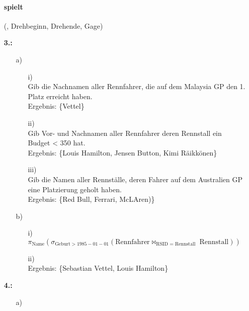 \documentclass[a4paper,11pt,fleqn]{scrartcl}
\begin{document}
\begin{enumerate}
		    \paragraph{spielt}(, Drehbeginn, 
		    Drehende, Gage)\\
		\item[\textbf{3.:}]
		\begin{enumerate}
			\item[a)]\quad \\
			\begin{enumerate}
				\item[i)]\quad \\
					Gib die Nachnamen aller Rennfahrer, die auf dem Malaysia GP den 1. Platz erreicht haben.\\
                  	Ergebnis: \{Vettel\}
				\item[ii)]\quad \\
					Gib Vor- und Nachnamen aller Rennfahrer deren Rennstall ein Budget < 350 hat.\\
	                Ergebnis: \{Louis Hamilton, Jensen Button, Kimi Räikkönen\}
				\item[iii)]\quad \\
					Gib die Namen aller Rennställe, deren Fahrer auf dem Australien GP eine Platzierung geholt haben.\\
                    Ergebnis: \{Red Bull, Ferrari, McLAren)\}
			\end{enumerate}
			\item[b)]\quad \\
			\begin{enumerate}
				\item[i)]\quad \\
                                        $\pi_{\text{Name}}(\sigma_{\text{Geburt} > 1985-01-01}(\text{Rennfahrer} \bowtie_{\text{RSID = Rennstall
                                        }}\text{Rennstall}))$\\
                                \item[ii)]\quad \\
                                        Ergebnis: \{Sebastian Vettel, Louis Hamilton\}
			\end{enumerate}
		\end{enumerate}
		\newpage
		\item[\textbf{4.:}]
		\begin{enumerate}
			\item[a)]\quad \\

\end{enumerate}
\end{enumerate}
\end{document}
